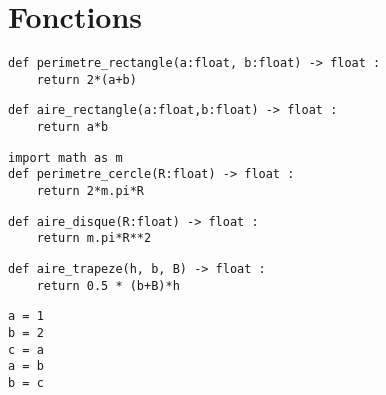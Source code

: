 \section*{Fonctions}
\ifprof
\begin{corrige}
\begin{lstlisting}
def perimetre_rectangle(a:float, b:float) -> float : 
    return 2*(a+b)
\end{lstlisting}
\end{corrige}
\else
\fi

\ifprof
\begin{corrige}
\begin{lstlisting}
def aire_rectangle(a:float,b:float) -> float :
    return a*b
\end{lstlisting}
\end{corrige}
\else
\fi

\ifprof
\begin{corrige}
\begin{lstlisting}
import math as m
def perimetre_cercle(R:float) -> float :
    return 2*m.pi*R
\end{lstlisting}
\end{corrige}
\else
\fi

\ifprof
\begin{corrige}
\begin{lstlisting}
def aire_disque(R:float) -> float :
    return m.pi*R**2
\end{lstlisting}
\end{corrige}
\else
\fi

\ifprof
\begin{corrige}
\begin{lstlisting}
def aire_trapeze(h, b, B) -> float :
    return 0.5 * (b+B)*h
\end{lstlisting}
\end{corrige}
\else
\fi

\ifprof
\begin{corrige}
\begin{lstlisting}
a = 1
b = 2
c = a
a = b 
b = c
\end{lstlisting}
\end{corrige}
\else
\fi
